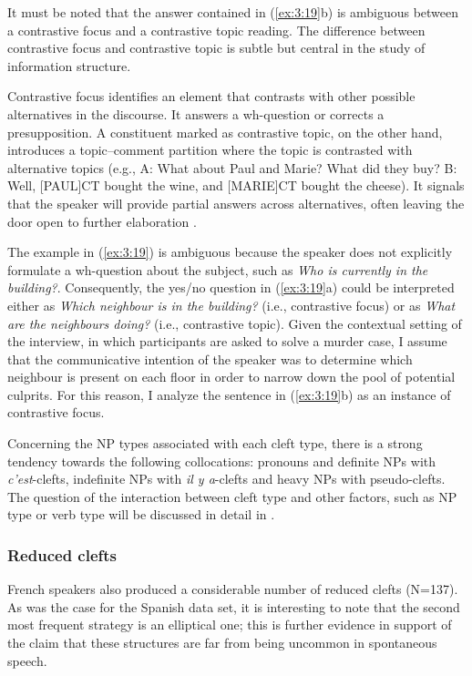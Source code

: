 {It must be noted that the answer contained in (\ref{ex:3:19}b) is ambiguous between a contrastive focus and a contrastive topic reading. The difference between contrastive focus and contrastive topic is subtle but central in the study of information structure.

Contrastive focus identifies an element that contrasts with other possible alternatives in the discourse. It answers a wh-question or corrects a presupposition. A constituent marked as contrastive topic, on the other hand, introduces a topic–comment partition where the topic is contrasted with alternative topics (e.g., A: What about Paul and Marie? What did they buy? B: Well, [PAUL]\tiny{CT} \normalsize bought the wine, and [MARIE]\tiny{CT} \normalsize bought the cheese). It signals that the speaker will provide partial answers across alternatives, often leaving the door open to further elaboration \parencite{krifka2008basic}.

The example in (\ref{ex:3:19}) is ambiguous because the speaker does not explicitly formulate a wh-question about the subject, such as \textit{Who is currently in the building?}. Consequently, the yes/no question in (\ref{ex:3:19}a) could be interpreted either as \textit{Which neighbour is in the building?} (i.e., contrastive focus) or as \textit{What are the neighbours doing?} (i.e., contrastive topic). Given the contextual setting of the interview, in which participants are asked to solve a murder case, I assume that the communicative intention of the speaker was to determine which neighbour is present on each floor in order to narrow down the pool of potential culprits. For this reason, I analyze the sentence in (\ref{ex:3:19}b) as an instance of contrastive focus.
 
Concerning the NP types associated with each cleft type, there is a strong tendency towards the following collocations: pronouns and definite NPs with \textit{c'est}-clefts, indefinite NPs with \textit{il y a}-clefts and heavy NPs with pseudo-clefts. The question of the interaction between cleft type and other factors, such as NP type or verb type will be discussed in detail in .

\subsubsection{Reduced clefts} \label{sub:4.6.1.2}

French speakers also produced a considerable number of reduced clefts (N=137). As was the case for the Spanish data set, it is interesting to note that the second most frequent strategy is an elliptical one; this is further evidence in support of the claim that these structures are far from being uncommon in spontaneous speech.

}
